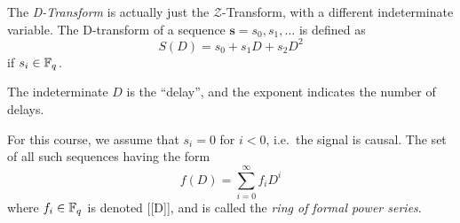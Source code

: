 \begin{definition}[D-Transform]\label{def:D_Transform}
  The \emph{D-Transform} is actually just the $\mathcal{Z}$-Transform, with a different indeterminate variable.
  The D-transform of a sequence $\mathbf{s} = s_{0}, s_{1}, \ldots$ is defined as
  \begin{equation}\label{eq:D_Transform_Sequence}
    S(D) = s_{0} + s_{1}D + s_{2}D^{2}
  \end{equation}
  if $s_{i} \in \mathbb{F}_{q^{}}$.

  The indeterminate $D$ is the ``delay'', and the exponent indicates the number of delays.

  \begin{remark}
    For this course, we assume that $s_{i} = 0$ for $i < 0$, i.e.\ the signal is causal.
    The set of all such sequences having the form
    \begin{equation*}
      f(D) = \sum\limits_{i=0}^{\infty} f_{i}D^{i}
    \end{equation*}
    where $f_{i} \in \mathbb{F}_{q^{}}$ is denoted [[D]], and is called the \emph{ring of formal power series}.
  \end{remark}
\end{definition}

